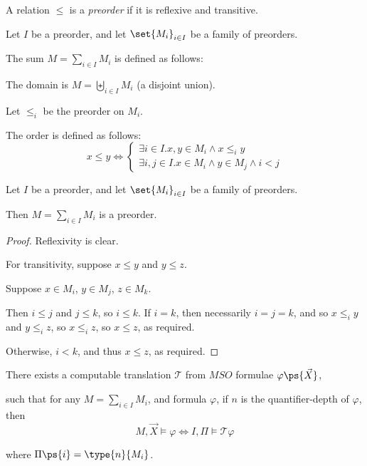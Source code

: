 \begin{definition}
  A relation $\le$ is a \emph{preorder} if it is reflexive and transitive.
\end{definition}

\begin{definition}
  Let $I$ be a preorder, and let $\set{M_i}_{i \in I}$ be a family of preorders.

  The sum $M = \sum_{i \in I} M_i$ is defined as follows:

  The domain is $M = \biguplus_{i \in I} M_i$ (a disjoint union).

  Let $\le_i$ be the preorder on $M_i$.

  The order is defined as follows:
  \[
    x \le y \iff \begin{cases}
      \exists i \in I. x, y \in M_i \land x \le_i y \\
      \exists i, j \in I. x \in M_i \land y \in M_j \land i < j
    \end{cases}
  \]
\end{definition}

\begin{lemma}
  Let $I$ be a preorder, and let $\set{M_i}_{i \in I}$ be a family of preorders.

  Then $M = \sum_{i \in I} M_i$ is a preorder.
\end{lemma}

\begin{proof}
  Reflexivity is clear.

  For transitivity, suppose $x \le y$ and $y \le z$.

  Suppose $x \in M_i$, $y \in M_j$, $z \in M_k$.

  Then $i \le j$ and $j \le k$, so $i \le k$.
  If $i = k$, then necessarily $i = j = k$, and so $x \le_i y$ and $y \le_i z$,
  so $x \le_i z$, so $x \le z$, as required.

  Otherwise, $i < k$, and thus $x \le z$, as required.
\end{proof}

\begin{theorem}
  There exists a computable translation $\mathcal{T}$
  from $MSO$ formulae $\varphi \ps{\vec{X}}$,

  such that for any $M = \sum_{i \in I} M_i$, and formula $\varphi$,
  if $n$ is the quantifier-depth of $\varphi$,
  then
  \[
    M, \vec{X} \models \varphi \iff I, \Pi \models \mathcal{T} {\varphi}
  \]

  where $\Pi \ps{i} = \type{n}{M_i}$.
\end{theorem}

